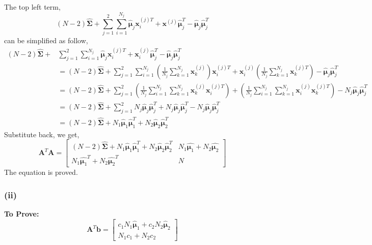 \documentclass[11pt]{article}
\begin{document}
The top left term,
$$(N-2)\hat{\pmb{\Sigma}}+\sum_{j=1}^{2}\sum_{i=1}^{N_j}\hat{\pmb{\mu}}_j\pmb{x}^{(j)T}_i+\pmb{x}^{(j)}\hat{\pmb{\mu}}^T_j-\hat{\pmb{\mu}}_j\hat{\pmb{\mu}}^T_j$$
can be simplified as follow,
\begin{equation}
\begin{split}
(N-2)\hat{\pmb{\Sigma}}+&\sum_{j=1}^{2}\sum_{i=1}^{N_j}\hat{\pmb{\mu}}_j\pmb{x}^{(j)T}_i+\pmb{x}^{(j)}_i\hat{\pmb{\mu}}^T_j-\hat{\pmb{\mu}}_j\hat{\pmb{\mu}}^T_j\\
&=(N-2)\hat{\pmb{\Sigma}}+\sum_{j=1}^{2}\sum_{i=1}^{N_j}\left(\frac{1}{N_j}\sum_{k=1}^{N_j}\pmb{x}^{(j)}_k\right)\pmb{x}^{(j)T}_i+\pmb{x}^{(j)}_i\left(\frac{1}{N_j}\sum_{k=1}^{N_j}\pmb{x}^{(j)T}_k\right)-\hat{\pmb{\mu}}_j\hat{\pmb{\mu}}^T_j\\
&=(N-2)\hat{\pmb{\Sigma}}+\sum_{j=1}^{2}\left(\frac{1}{N_j}\sum_{i=1}^{N_j}\sum_{k=1}^{N_j}\pmb{x}^{(j)}_k\pmb{x}^{(j)T}_i\right)+\left(\frac{1}{N_j}\sum_{i=1}^{N_j}\sum_{k=1}^{N_j}\pmb{x}^{(j)}_i\pmb{x}^{(j)T}_k\right)-N_j\hat{\pmb{\mu}}_j\hat{\pmb{\mu}}^T_j\\
&=(N-2)\hat{\pmb{\Sigma}}+\sum_{j=1}^{2}N_j\hat{\pmb{\mu}}_j\hat{\pmb{\mu}}^T_j+N_j\hat{\pmb{\mu}}_j\hat{\pmb{\mu}}^T_j-N_j\hat{\pmb{\mu}}_j\hat{\pmb{\mu}}^T_j\\
&=(N-2)\hat{\pmb{\Sigma}}+N_1\hat{\pmb{\mu}}_1\hat{\pmb{\mu}}^T_1+N_2\hat{\pmb{\mu}}_2\hat{\pmb{\mu}}^T_2
\end{split}
\end{equation}
Substitute back, we get,
$$\pmb{A}^T\pmb{A}=\begin{bmatrix}
(N-2)\hat{\pmb{\Sigma}}+N_1\hat{\pmb{\mu}}_1\hat{\pmb{\mu}}_1^T+N_2\hat{\pmb{\mu}}_2\hat{\pmb{\mu}}_2^T & N_1\hat{\pmb{\mu}_1}+N_2\hat{\pmb{\mu}_2}\\
N_1\hat{\pmb{\mu}_1}^T+N_2\hat{\pmb{\mu}_2}^T & N
\end{bmatrix}$$
The equation is proved.

\subsubsection*{(ii)}
\noindent \textbf{To Prove:}
$$\pmb{A}^T\pmb{b} = \begin{bmatrix}
c_1N_1\hat{\pmb{\mu}}_1+c_2N_2\hat{\pmb{\mu}}_2\\
N_1c_1+N_2c_2
\end{bmatrix}$$
\end{document}
